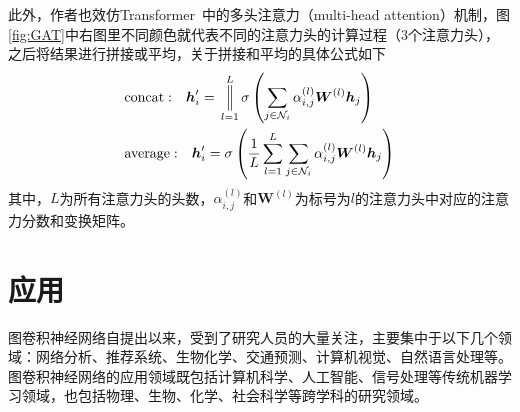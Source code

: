 \documentclass[final]{cvpr}
\begin{document}
此外，作者也效仿Transformer~\cite{vaswani2017attention}中的多头注意力（multi-head attention）机制，图\ref{fig:GAT}中右图里不同颜色就代表不同的注意力头的计算过程（3个注意力头），之后将结果进行拼接或平均，关于拼接和平均的具体公式如下
\begin{align}
    & \mathrm{concat:}\quad 
    \boldsymbol{h}'_i =
    \sideset{}{}{\mathop{\Big \Vert}}_{l=1}^L
    \sigma \left(
    \sum_{j \in \mathcal{N}_i}
    \alpha_{i,j}^{(l)} \boldsymbol{W}^{(l)} \boldsymbol{h}_j
    \right)   \label{gat-concat} \\
    & \mathrm{average:}\quad 
    \boldsymbol{h}'_i =
    \sigma \left(
    \frac{1}{L} 
    \sum_{l=1}^L
    \sum_{j \in \mathcal{N}_i}
    \alpha_{i,j}^{(l)} \boldsymbol{W}^{(l)} \boldsymbol{h}_j
    \right) \label{gat-avg} 
\end{align}
 其中，$L$为所有注意力头的头数，$\alpha_{i,j}^{(l)}$和$\boldsymbol{W}^{(l)}$为标号为$l$的注意力头中对应的注意力分数和变换矩阵。
 






\section{应用}

图卷积神经网络自提出以来，受到了研究人员的大量关注，主要集中于以下几个领域：网络分析、推荐系统、生物化学、交通预测、计算机视觉、自然语言处理等。图卷积神经网络的应用领域既包括计算机科学、人工智能、信号处理等传统机器学习领域，也包括物理、生物、化学、社会科学等跨学科的研究领域。
\end{document}
